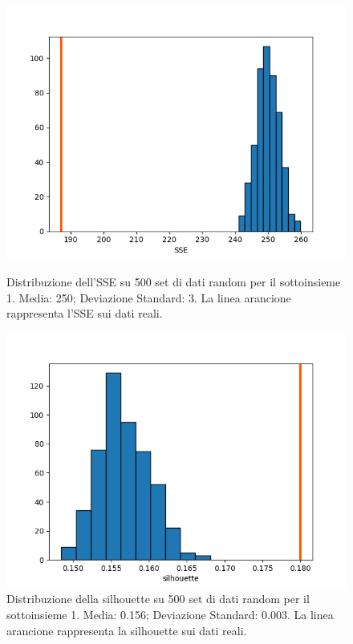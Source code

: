 \documentclass[a4paper,9pt]{article}
\begin{document}
\begin{figure}[H]
\begin{minipage}[b]{0.45\textwidth}
\centering
\includegraphics[width=\textwidth]{RandomSSE_1.png}
\caption{Distribuzione dell'SSE su 500 set di dati random per il sottoinsieme 1. Media: 250; Deviazione Standard: 3. La linea arancione rappresenta l'SSE sui dati reali.  }
\label{etichetta1}
\end{minipage}
\hfill
\begin{minipage}[b]{0.45\textwidth}
\centering
\includegraphics[width=\textwidth]{RandomSilhouette_1.png}
\caption{Distribuzione della silhouette su 500 set di dati random per il sottoinsieme 1. Media: 0.156; Deviazione Standard: 0.003. La linea arancione rappresenta la silhouette sui dati reali.}

\end{minipage}
\end{figure}
\end{document}
